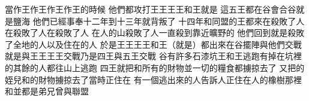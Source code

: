 \bchapter%
當作王\chientien{}作王\chientien{}作王\chientien{}作王的時候\chientien 
{}他們都攻打王\chientien{}王\chientien{}王\chientien{}王\chientien 和王\yuentien{}就是\chuan 
{}這五王都在谷會合\yuentien{}谷就是鹽海\chuan 
{}他們已經事奉十二年\chientien 到十三年就背叛了\chuan 
{}十四年和同盟的王\chientien 都來在\chientien 殺敗了人\chientien 在殺敗了人\chientien 在殺敗了人\chientien 
{}在人的山殺敗了人\chientien 一直殺到靠近曠野的\chuan 
{}他們回到\chientien 就是\chientien 殺敗了全地的人\chientien 以及住在的人\chuan 
{}於是王\chientien{}王\chientien{}王\chientien{}王\chientien 和王\chientien （就是）都出來\chientien 在谷擺陣\chientien 與他們交戰\yuentien 
{}就是與王\chientien{}王\chientien{}王\chientien{}王交戰\yuentien 乃是四王與五王交戰\chuan 
{}谷有許多石漆坑\yuentien {}王\chientien 和王逃跑\chientien 有掉在坑裡的\chientien 其餘的人都往山上逃跑\chuan 
{}四王就把和所有的財物\chientien 並一切的糧食\chientien 都擄掠去了\chuan 
{}又把的姪兒\chientien 和的財物擄掠去了\yuentien 當時\chientien{}正住在\chuan\Chuan
{}有一個逃出來的人\chientien{}告訴人\yuentien{}正住在人的橡樹那裡\yuentien{}和\chientien 並都是弟兄\chientien 曾與聯盟\chuan
